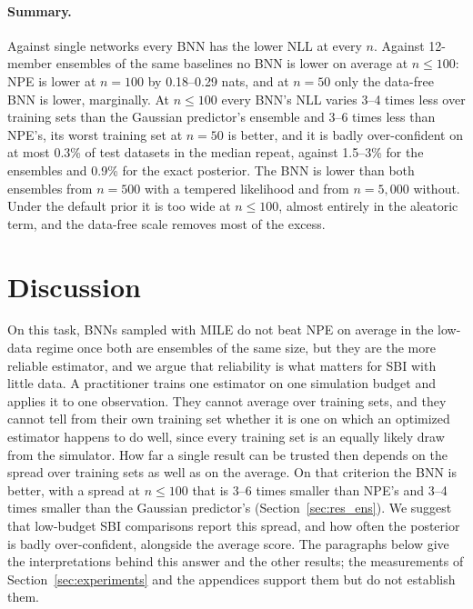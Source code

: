 \documentclass[11pt]{article}
\begin{document}
\paragraph{Summary.} Against single networks every BNN has the lower NLL at every $n$. Against 12-member ensembles of
the same baselines no BNN is lower on average at $n\le100$: NPE is lower at $n=100$ by 0.18--0.29 nats, and at $n=50$
only the data-free BNN is lower, marginally. At $n\le100$ every BNN's NLL varies 3--4 times less over training sets
than the Gaussian predictor's ensemble and 3--6 times less than NPE's, its worst training set at $n=50$ is better, and it is badly over-confident on at most 0.3\% of
test datasets in the median repeat, against 1.5--3\% for the ensembles and 0.9\% for the exact posterior. The BNN is
lower than both ensembles from $n=500$ with a tempered likelihood and from $n=5{,}000$ without. Under the default prior
it is too wide at $n\le100$, almost entirely in the aleatoric term, and the data-free scale removes most of the excess.

\section{Discussion}
\label{sec:discussion}
\label{sec:disc_answer}
On this task, BNNs sampled with MILE do not beat NPE on average in the low-data regime once both are ensembles of the
same size, but they are the more reliable estimator, and we argue that reliability is what matters for SBI with little
data. A practitioner trains one estimator on one simulation budget and applies it to one observation. They cannot
average over training sets, and they cannot tell from their own training set whether it is one on which an optimized
estimator happens to do well, since every training set is an equally likely draw from the simulator. How far a single
result can be trusted then depends on the spread over training sets as well as on the average. On that criterion the
BNN is better, with a spread at $n\le100$ that is 3--6 times smaller than NPE's and 3--4 times smaller than the Gaussian
predictor's (Section~\ref{sec:res_ens}). We suggest that low-budget SBI comparisons report this spread, and how often the
posterior is badly over-confident, alongside the average score. The paragraphs below give the interpretations behind
this answer and the other results; the measurements of Section~\ref{sec:experiments} and the appendices support them
but do not establish them.
\end{document}
